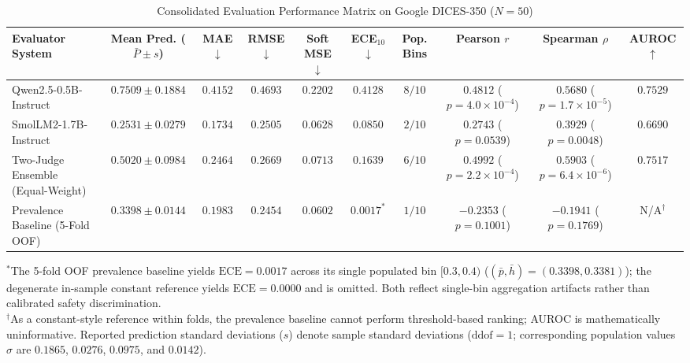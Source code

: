 \begin{table}[t]
\centering
\caption{Consolidated Evaluation Performance Matrix on Google DICES-350 ($N=50$)}
\label{tab:main_results}
\renewcommand{\arraystretch}{1.2}
\setlength{\tabcolsep}{5pt}
\begin{tabular}{lccccccccc}
\toprule
\textbf{Evaluator System} & \textbf{Mean Pred.} ($\bar{P}\pm s$) & \textbf{MAE} $\downarrow$ & \textbf{RMSE} $\downarrow$ & \textbf{Soft MSE} $\downarrow$ & \textbf{ECE}$_{10}$ $\downarrow$ & \textbf{Pop. Bins} & \textbf{Pearson} $r$ & \textbf{Spearman} $\rho$ & \textbf{AUROC} $\uparrow$ \\
\midrule
Qwen2.5-0.5B-Instruct & $0.7509 \pm 0.1884$ & $0.4152$ & $0.4693$ & $0.2202$ & $0.4128$ & $8/10$ & $0.4812$ ($p=4.0\times 10^{-4}$) & $0.5680$ ($p=1.7\times 10^{-5}$) & $\mathbf{0.7529}$ \\
SmolLM2-1.7B-Instruct & $0.2531 \pm 0.0279$ & $\mathbf{0.1734}$ & $0.2505$ & $0.0628$ & $0.0850$ & $2/10$ & $0.2743$ ($p=0.0539$) & $0.3929$ ($p=0.0048$) & $0.6690$ \\
Two-Judge Ensemble (Equal-Weight) & $0.5020 \pm 0.0984$ & $0.2464$ & $0.2669$ & $0.0713$ & $0.1639$ & $6/10$ & $\mathbf{0.4992}$ ($p=2.2\times 10^{-4}$) & $\mathbf{0.5903}$ ($p=6.4\times 10^{-6}$) & $0.7517$ \\
\midrule
Prevalence Baseline (5-Fold OOF) & $0.3398 \pm 0.0144$ & $0.1983$ & $\mathbf{0.2454}$ & $\mathbf{0.0602}$ & $0.0017^*$ & $1/10$ & $-0.2353$ ($p=0.1001$) & $-0.1941$ ($p=0.1769$) & N/A$^\dagger$ \\
\bottomrule
\end{tabular}
\begin{flushleft}
\footnotesize
$^*$The 5-fold OOF prevalence baseline yields $\text{ECE}=0.0017$ across its single populated bin $[0.3, 0.4)$ ($(\bar{p}, \bar{h})=(0.3398, 0.3381)$); the degenerate in-sample constant reference yields $\text{ECE}=0.0000$ and is omitted. Both reflect single-bin aggregation artifacts rather than calibrated safety discrimination.\\
$^\dagger$As a constant-style reference within folds, the prevalence baseline cannot perform threshold-based ranking; AUROC is mathematically uninformative. Reported prediction standard deviations ($s$) denote sample standard deviations ($\text{ddof}=1$; corresponding population values $\sigma$ are $0.1865$, $0.0276$, $0.0975$, and $0.0142$).
\end{flushleft}
\end{table}

